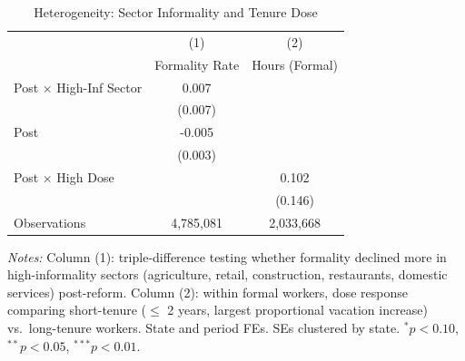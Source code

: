 \begin{table}[t]
\centering
\caption{Heterogeneity: Sector Informality and Tenure Dose}
\label{tab:heterogeneity}
\small
\begin{tabular}{lcc}
  \toprule
  & (1) & (2) \\
  & Formality Rate & Hours (Formal) \\
  \midrule
  Post $\times$ High-Inf Sector & 0.007 & \\
  & (0.007) & \\
  Post & -0.005 & \\
  & (0.003) & \\
  Post $\times$ High Dose & & 0.102 \\
  & & (0.146) \\
  \midrule
  Observations & 4,785,081 & 2,033,668 \\
  \bottomrule
\end{tabular}
\begin{tablenotes}
\small
\item \textit{Notes:} Column (1): triple-difference testing whether formality declined more in high-informality sectors (agriculture, retail, construction, restaurants, domestic services) post-reform. Column (2): within formal workers, dose response comparing short-tenure ($\leq$ 2 years, largest proportional vacation increase) vs.\ long-tenure workers. State and period FEs. SEs clustered by state. $^{*}p<0.10$, $^{**}p<0.05$, $^{***}p<0.01$.
\end{tablenotes}
\end{table}
